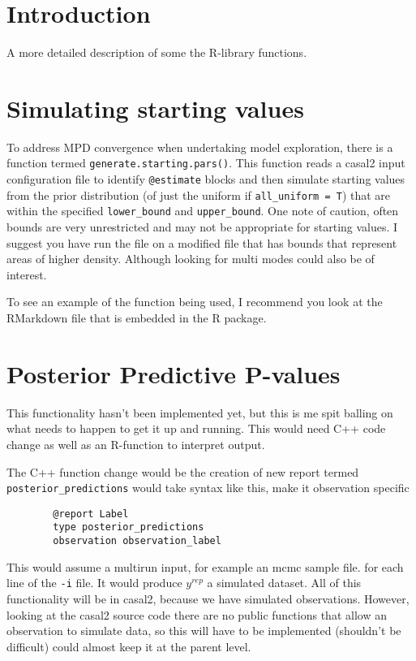 \documentclass[12pt,preprint,authoryear]{article}
\begin{document}
\section{Introduction}
A more detailed description of some the R-library functions.


\section{Simulating starting values}
To address MPD convergence when undertaking model exploration, there is a function termed \texttt{generate.starting.pars()}. This function reads a casal2 input configuration file to identify \texttt{@estimate} blocks and then simulate starting values from the prior distribution (of just the uniform if \texttt{all\_uniform = T}) that are within the specified \texttt{lower\_bound} and \texttt{upper\_bound}. One note of caution, often bounds are very unrestricted and may not be appropriate for starting values. I suggest you have run the file on a modified file that has bounds that represent areas of higher density. Although looking for multi modes could also be of interest.


To see an example of the function being used, I recommend you look at the RMarkdown file that is embedded in the R package.

\section{Posterior Predictive P-values}
This functionality hasn't been implemented yet, but this is me spit balling on what needs to happen to get it up and running. This would need C++ code change as well as an R-function to interpret output.

The C++ function change would be the creation of new report termed \texttt{posterior\_predictions} would take syntax like this, make it observation specific

{\small{\begin{verbatim}
		@report Label
		type posterior_predictions
		observation observation_label
		\end{verbatim}
	}
}

This would assume a multirun input, for example an mcmc sample file. for each line of the \texttt{-i} file. It would produce \(y^{rep}\) a simulated dataset. All of this functionality will be in casal2, because we have simulated observations. However, looking at the casal2 source code there are no public functions that allow an observation to simulate data, so this will have to be implemented (shouldn't be difficult) could almost keep it at the parent level.
\end{document}

